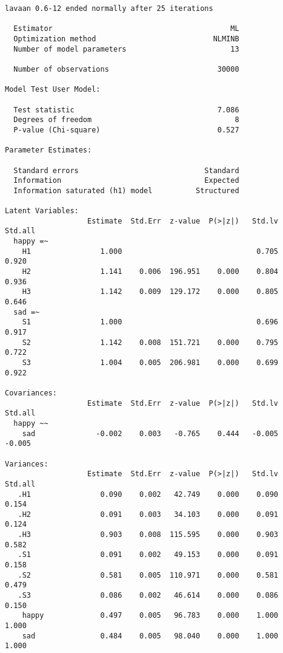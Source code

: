 \documentclass[
  letterpaper,
  DIV=11,
  numbers=noendperiod]{scrreprt}
\begin{document}
\begin{verbatim}
lavaan 0.6-12 ended normally after 25 iterations

  Estimator                                         ML
  Optimization method                           NLMINB
  Number of model parameters                        13

  Number of observations                         30000

Model Test User Model:
                                                      
  Test statistic                                 7.086
  Degrees of freedom                                 8
  P-value (Chi-square)                           0.527

Parameter Estimates:

  Standard errors                             Standard
  Information                                 Expected
  Information saturated (h1) model          Structured

Latent Variables:
                   Estimate  Std.Err  z-value  P(>|z|)   Std.lv  Std.all
  happy =~                                                              
    H1                1.000                               0.705    0.920
    H2                1.141    0.006  196.951    0.000    0.804    0.936
    H3                1.142    0.009  129.172    0.000    0.805    0.646
  sad =~                                                                
    S1                1.000                               0.696    0.917
    S2                1.142    0.008  151.721    0.000    0.795    0.722
    S3                1.004    0.005  206.981    0.000    0.699    0.922

Covariances:
                   Estimate  Std.Err  z-value  P(>|z|)   Std.lv  Std.all
  happy ~~                                                              
    sad              -0.002    0.003   -0.765    0.444   -0.005   -0.005

Variances:
                   Estimate  Std.Err  z-value  P(>|z|)   Std.lv  Std.all
   .H1                0.090    0.002   42.749    0.000    0.090    0.154
   .H2                0.091    0.003   34.103    0.000    0.091    0.124
   .H3                0.903    0.008  115.595    0.000    0.903    0.582
   .S1                0.091    0.002   49.153    0.000    0.091    0.158
   .S2                0.581    0.005  110.971    0.000    0.581    0.479
   .S3                0.086    0.002   46.614    0.000    0.086    0.150
    happy             0.497    0.005   96.783    0.000    1.000    1.000
    sad               0.484    0.005   98.040    0.000    1.000    1.000
\end{verbatim}
\end{document}
